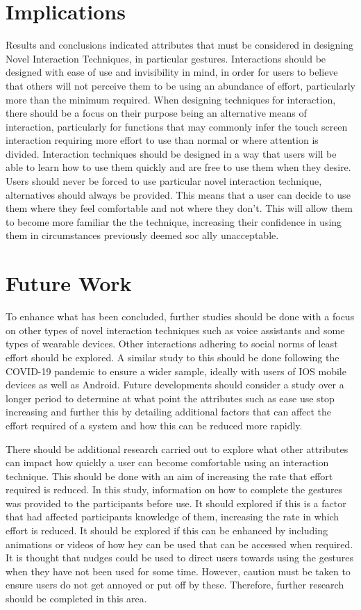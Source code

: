 \documentclass{l4proj}
\begin{document}
\section{Implications}
Results and conclusions indicated attributes that must be considered in designing Novel Interaction Techniques, in particular gestures. Interactions should be designed with ease of use and invisibility in mind, in order for users to believe that others will not perceive them to be using an abundance of effort, particularly more than the minimum required. When designing techniques for interaction, there should be a focus on their purpose being an alternative means of interaction, particularly for functions that may commonly infer the touch screen interaction requiring more effort to use than normal or where attention is divided. Interaction techniques should be designed in a way that users will be able to learn how to use them quickly and are free to use them when they desire. Users should never be forced to use particular novel interaction technique, alternatives should always be provided. This means that a user can decide to use them where they feel comfortable and not where they don't. This will allow them to become more familiar the the technique, increasing their confidence in using them in circumstances previously deemed soc ally unacceptable.


\section{Future Work}
To enhance what has been concluded, further studies should be done with a focus on other types of novel interaction techniques such as voice assistants and some types of wearable devices. Other interactions adhering to social norms of least effort should be explored. A similar study to this should be done following the COVID-19 pandemic to ensure a wider sample, ideally with users of IOS mobile devices as well as Android. Future developments should consider a study over a longer period to determine at what point the attributes such as ease use stop increasing and further this by detailing additional factors that can affect the effort required of a system and how this can be reduced more rapidly. 

There should be additional research carried out to explore what other attributes can impact how quickly a user can become comfortable using an interaction technique. This should be done with an aim of increasing the rate that effort required is reduced. In this study, information on how to complete the gestures was provided to the participants before use. It should explored if this is a factor that had affected participants knowledge of them, increasing the rate in which effort is reduced. It should be explored if this can be enhanced by including animations or videos of how hey can be used that can be accessed when required. It is thought that nudges could be used to direct users towards using the gestures when they have not been used for some time. However, caution must be taken to ensure users do not get annoyed or put off by these. Therefore, further research should be completed in this area.
\end{document}
